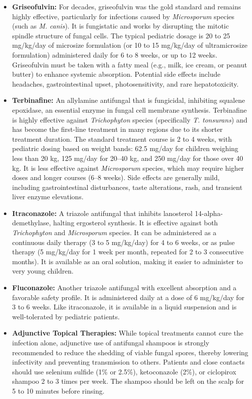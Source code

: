 \begin{itemize}
    \item \textbf{Griseofulvin:} For decades, griseofulvin was the gold standard and remains highly effective, particularly for infections caused by \textit{Microsporum} species (such as \textit{M. canis}). It is fungistatic and works by disrupting the mitotic spindle structure of fungal cells. The typical pediatric dosage is 20 to 25 mg/kg/day of microsize formulation (or 10 to 15 mg/kg/day of ultramicrosize formulation) administered daily for 6 to 8 weeks, or up to 12 weeks. Griseofulvin must be taken with a fatty meal (e.g., milk, ice cream, or peanut butter) to enhance systemic absorption. Potential side effects include headaches, gastrointestinal upset, photosensitivity, and rare hepatotoxicity.
    \item \textbf{Terbinafine:} An allylamine antifungal that is fungicidal, inhibiting squalene epoxidase, an essential enzyme in fungal cell membrane synthesis. Terbinafine is highly effective against \textit{Trichophyton} species (specifically \textit{T. tonsurans}) and has become the first-line treatment in many regions due to its shorter treatment duration. The standard treatment course is 2 to 4 weeks, with pediatric dosing based on weight bands: 62.5 mg/day for children weighing less than 20 kg, 125 mg/day for 20--40 kg, and 250 mg/day for those over 40 kg. It is less effective against \textit{Microsporum} species, which may require higher doses and longer courses (6--8 weeks). Side effects are generally mild, including gastrointestinal disturbances, taste alterations, rash, and transient liver enzyme elevations.
    \item \textbf{Itraconazole:} A triazole antifungal that inhibits lanosterol 14-alpha-demethylase, halting ergosterol synthesis. It is effective against both \textit{Trichophyton} and \textit{Microsporum} species. It can be administered as a continuous daily therapy (3 to 5 mg/kg/day) for 4 to 6 weeks, or as pulse therapy (5 mg/kg/day for 1 week per month, repeated for 2 to 3 consecutive months). It is available as an oral solution, making it easier to administer to very young children.
    \item \textbf{Fluconazole:} Another triazole antifungal with excellent absorption and a favorable safety profile. It is administered daily at a dose of 6 mg/kg/day for 3 to 6 weeks. Like itraconazole, it is available in a liquid suspension and is well-tolerated by pediatric patients.
    \item \textbf{Adjunctive Topical Therapies:} While topical treatments cannot cure the infection alone, adjunctive use of antifungal shampoos is strongly recommended to reduce the shedding of viable fungal spores, thereby lowering infectivity and preventing transmission to others. Patients and close contacts should use selenium sulfide (1\% or 2.5\%), ketoconazole (2\%), or ciclopirox shampoo 2 to 3 times per week. The shampoo should be left on the scalp for 5 to 10 minutes before rinsing.

\end{itemize}
